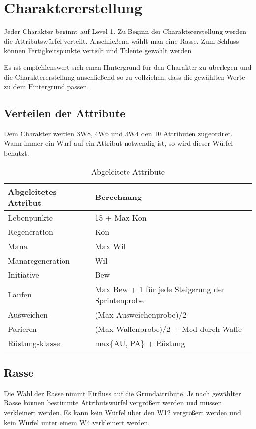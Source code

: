 \documentclass[../../Heldenanleitung2]{subfiles}
\begin{document}
\chapter{Charaktererstellung}
Jeder Charakter beginnt auf Level 1. Zu Beginn der Charaktererstellung werden die Attributswürfel verteilt. Anschließend wählt man eine Rasse. Zum Schluss können Fertigkeitspunkte verteilt und Talente gewählt werden.

Es ist empfehlenswert sich einen Hintergrund für den Charakter zu überlegen und die Charaktererstellung anschließend so zu vollziehen, dass die gewählten Werte zu dem Hintergrund passen.

\section{Verteilen der Attribute}

Dem Charakter werden 3W8, 4W6 und 3W4 den 10 Attributen zugeordnet. Wann immer ein Wurf auf ein Attribut notwendig ist, so wird dieser Würfel benutzt.
\renewcommand{\arraystretch}{1.5}
{
\begin{table}[h!]
\centering
\caption{Abgeleitete Attribute}
\label{tab:AbgeleiteteAtribute}
\begin{tabular}{|l|l|}
\hline
\textbf{Abgeleitetes Attribut} & \textbf{Berechnung}\\
\hline
Lebenpunkte & 15 + Max Kon\\
Regeneration & Kon\\
Mana & Max Wil\\
Manaregeneration & Wil\\
Initiative & Bew\\
Laufen & Max Bew + 1 für jede Steigerung der Sprintenprobe\\
Ausweichen & (Max Ausweichenprobe)/2\\
Parieren & (Max Waffenprobe)/2 + Mod durch Waffe\\
Rüstungsklasse & max\{AU, PA\} + Rüstung
\\
\hline
\end{tabular}
\end{table}
}

\section{Rasse}

Die Wahl der Rasse nimmt Einfluss auf die Grundattribute. Je nach gewählter Rasse können bestimmte Attributswürfel vergrößert werden und müssen verkleinert werden. Es kann kein Würfel über den W12 vergrößert werden und kein Würfel unter einem W4 verkleinert werden.
\end{document}
